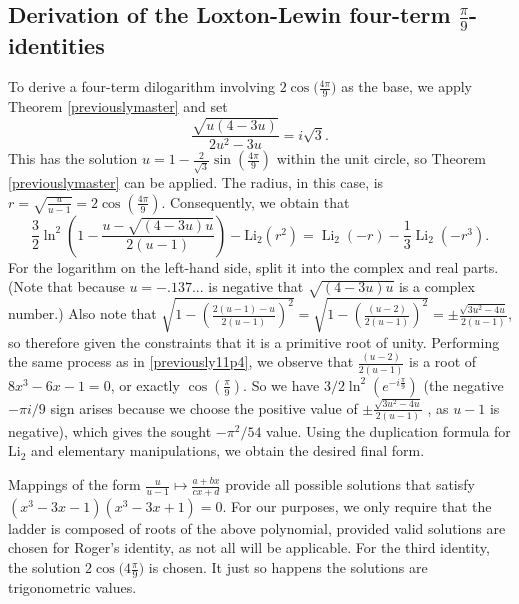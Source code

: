 \documentclass[12pt]{article}
\begin{document}
\subsection{Derivation of the Loxton-Lewin four-term $\frac{\pi}{9}$-identities}
 To derive a four-term dilogarithm involving $2\cos\big(\frac{4\pi}{9}\big)$ as the base, we apply Theorem 
 \ref{previouslymaster} and set 
\begin{equation*}
 \frac{\sqrt{u (4-3u)}}{2 u^2 - 3 u} = i \sqrt{3}. 
\end{equation*}
 This has the solution $u=1 - \frac{2}{\sqrt{3}} \sin\left(\frac{4\pi}{9}\right)$ 
 within the unit circle, so Theorem \ref{previouslymaster} can be applied. The radius, in this case, is 
 $r=\sqrt{\frac{u}{u - 1}} = 2\cos\left(\frac{4\pi}{9}\right)$. 
 Consequently, we obtain that 
\begin{equation*}
 \frac{3}{2} \ln^2 \left( 1 - \frac{u - \sqrt{(4 - 3 u) u}}{2 (u-1)} \right) 
 - \operatorname{Li_2} (r^2) = \operatorname{Li}_2 (-r) - \frac{1}{3} \operatorname{Li}_2 (-r^3). 
\end{equation*}
 For the logarithm on the left-hand side, split it into the complex and real parts. (Note that because $u=-.137...$ is negative that 
 $\sqrt{(4 - 3 u)u}$ is a complex number.) Also note that $\sqrt{1 - \left( \frac{2(u - 1) - u}{2(u - 1)} \right)^2} = \sqrt{1 - 
 \left(\frac{(u - 2)}{2 (u - 1)}\right)^2} = \pm \frac{\sqrt{3u^2 - 4u}}{2(u - 1)}$, so therefore given the constraints that it is a primitive root 
 of unity. Performing the same process as in \eqref{previously11p4}, we observe that $\frac{(u - 2)}{2 (u - 1)}$ is a root of $8 x^3 - 6 x - 
 1=0$, or exactly $\cos(\frac{\pi}{9})$. So we have $3/2 \ln^2(e^{-i\frac{\pi}{9}})$ (the negative $-\pi i/9$ sign arises because we choose 
 the positive value of $\pm \frac{\sqrt{3u^2 - 4u}}{2(u - 1)}$ , as $u-1$ is negative), which gives the sought $-\pi^2/54$ value. 
 Using the duplication formula for $\operatorname{Li_2}$
 and elementary manipulations, we obtain the desired final form. 

 Mappings of the form $\frac{u}{u-1} \mapsto \frac{a+bx}{cx+d}$ provide all possible solutions that satisfy $(x^3 - 3 x - 1) (x^3 - 
 3 x + 1) = 0$. For our purposes, we only require that the ladder is composed of roots of the above polynomial, provided valid solutions 
 are chosen for Roger's identity, as not all will be applicable. For the third identity, the solution $2\cos\big(4\frac{\pi}{9} \big)$ is chosen. 
 It just so happens the solutions are trigonometric values. 
\end{document}
